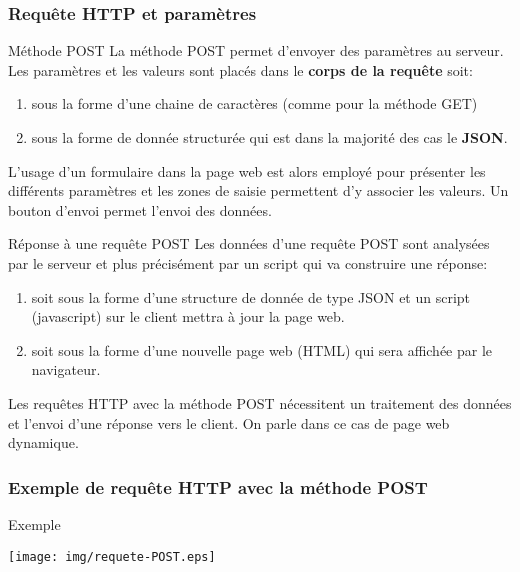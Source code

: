\documentclass[8pt]{beamer}
\newcounter{num}
\begin{document}
\begin{frame}
\frametitle{Requête HTTP et paramètres}

\begin{block}{Méthode POST}
La méthode POST permet d'envoyer des paramètres au serveur. Les paramètres et les valeurs sont placés dans le \textbf{corps de la requête} soit:
\begin{enumerate}
\item sous la forme d'une chaine de caractères (comme pour la méthode GET)
\item sous la forme de donnée structurée qui est dans la majorité des cas le \textbf{JSON}. 
\end{enumerate}

L'usage d'un formulaire dans la page web est alors employé pour présenter les différents paramètres et les zones de saisie permettent d'y associer les valeurs. Un bouton d'envoi permet l'envoi des données.
\end{block}

\begin{block}{Réponse à une requête POST}
Les données d'une requête POST sont analysées par le serveur et plus précisément par un script qui va construire une réponse:
\begin{enumerate}
\item soit sous la forme d'une structure de donnée de type JSON et un script (javascript) sur le client mettra à jour la page web.
\item soit sous la forme d'une nouvelle page web (HTML) qui sera affichée par le navigateur.
\end{enumerate}

Les requêtes HTTP avec la méthode POST nécessitent un traitement des données et l'envoi d'une réponse vers le client. On parle dans ce cas de page web dynamique.
\end{block}
\end{frame}


\begin{frame}
\frametitle{Exemple de requête HTTP avec la méthode POST}

\begin{exampleblock}{Exemple}
\begin{center}
\texttt{[image: img/requete-POST.eps]}
\end{center}
\end{exampleblock}

\end{frame}
\end{document}
